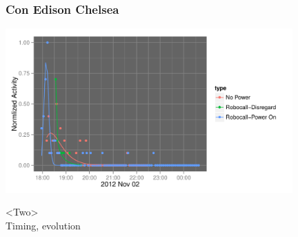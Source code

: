 \documentclass{beamer}
\begin{document}
\begin{frame}\frametitle{Con Edison Chelsea}
  \begin{center}
    \includegraphics[width=11cm]{./imgs/fake_fit2.pdf}
  \end{center}
\end{frame}

%


\begin{frame}
\begin{center}
{\Huge <Two> \\ [10pt] Timing, evolution}
\end{center}
\end{frame}

%
\end{document}
